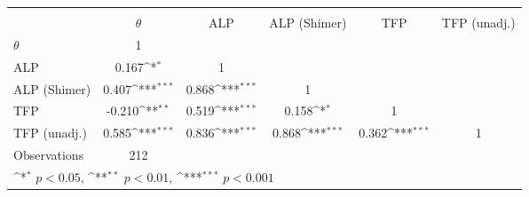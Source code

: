 {
\def\sym#1{\ifmmode^{#1}\else\(^{#1}\)\fi}
\begin{tabular}{l*{5}{c}}
\toprule
                &\multicolumn{5}{c}{}                                                                          \\
                & $\theta$         &      ALP         &ALP (Shimer)         &      TFP         &TFP (unadj.)         \\
\midrule
$\theta$        &        1         &                  &                  &                  &                  \\
ALP             &    0.167\sym{*}  &        1         &                  &                  &                  \\
ALP (Shimer)    &    0.407\sym{***}&    0.868\sym{***}&        1         &                  &                  \\
TFP             &   -0.210\sym{**} &    0.519\sym{***}&    0.158\sym{*}  &        1         &                  \\
TFP (unadj.)    &    0.585\sym{***}&    0.836\sym{***}&    0.868\sym{***}&    0.362\sym{***}&        1         \\
\midrule
Observations    &      212         &                  &                  &                  &                  \\
\bottomrule
\multicolumn{6}{l}{\footnotesize \sym{*} \(p<0.05\), \sym{**} \(p<0.01\), \sym{***} \(p<0.001\)}\\
\end{tabular}
}
